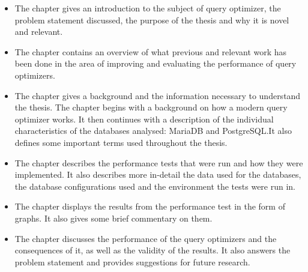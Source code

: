 \begin{itemize}
\item The  chapter gives an introduction to the
  subject of query optimizer, the problem statement discussed, the purpose of
  the thesis and why it is novel and relevant.
\item The  chapter contains an overview of what
  previous and relevant work has been done in the area of improving and
  evaluating the performance of query optimizers.
\item The  chapter gives a background and the information
  necessary to understand the thesis. The chapter begins with a background on
  how a modern query optimizer works. It then continues with a description of
  the individual characteristics of the databases analysed: MariaDB and
  PostgreSQL.\@ It also defines some important terms used throughout the thesis.
\item The  chapter describes the performance tests that
  were run and how they were implemented. It also describes more in-detail the
  data used for the databases, the database configurations used and the
  environment the tests were run in.
\item The  chapter displays the results from the
  performance test in the form of graphs. It also gives some brief commentary on
  them.
\item The  chapter discusses the performance of the
  query optimizers and the consequences of it, as well as the validity of the
  results. It also answers the problem statement and provides suggestions for
  future research.
\end{itemize}